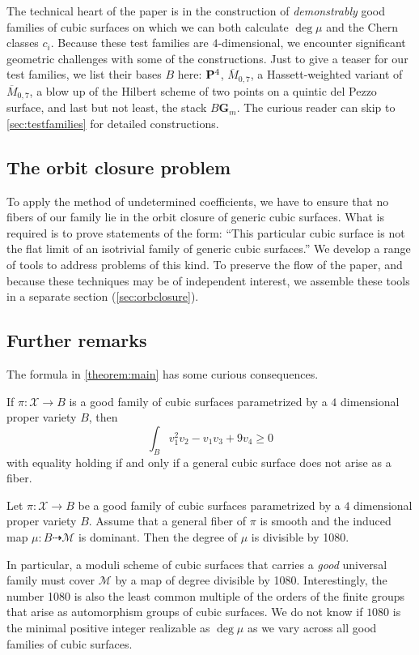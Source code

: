 \documentclass[12pt,reqno]{amsart}
\renewcommand{\to}{{\longrightarrow}}
\numberwithin{equation}{section}
\newcommand{\G}{\mathbf G}
\newcommand{\cX}{\mathcal{X}}
\begin{document}
The technical heart of the paper is in the construction of {\sl
  demonstrably} good families of cubic surfaces on which we can both
calculate $\deg \mu$ and the Chern classes $c_i$. Because these test
families are $4$-dimensional, we encounter significant geometric
challenges with some of the constructions.  Just to give a teaser for
our test families, we list their bases $B$ here: $\P^4$,
$\overline M_{0,7}$, a Hassett-weighted variant of
$\overline M_{0,7}$, a blow up of the Hilbert scheme of two points on
a quintic del Pezzo surface, and last but not least, the stack
$B\G_m$.  The curious reader can skip to \autoref{sec:testfamilies}
for detailed constructions.



\subsection{The orbit closure problem}
To apply the method of undetermined coefficients, we have to ensure
that no fibers of our family lie in the orbit closure of generic cubic
surfaces.  What is required is to prove statements of the form: ``This
particular cubic surface is not the flat limit of an isotrivial family
of generic cubic surfaces.''  We develop a range of tools to address
problems of this kind.  To preserve the flow of the paper, and because
these techniques may be of independent interest, we assemble these
tools in a separate section (\autoref{sec:orbclosure}).

\subsection{Further remarks}
The formula in \autoref{theorem:main} has some curious consequences.
\begin{corollary}
  \label{cor:ineq} If $\pi \colon \cX \to B$ is a good family of cubic
  surfaces parametrized by a $4$ dimensional proper variety $B$, then
  \[\int_{B} v_{1}^{2}v_{2} - v_{1}v_3 + 9v_{4} \geq 0\]
  with
  equality holding if and only if a general cubic surface does not
  arise as a fiber.
\end{corollary}

\begin{corollary}
  \label{cor:div} Let $\pi \colon \cX \to B$ be a good family of cubic
  surfaces parametrized by a $4$ dimensional proper variety $B$.
  Assume that a general fiber of $\pi$ is smooth and the induced map
  $\mu \colon B \dashrightarrow \mathcal M$ is dominant.  Then the
  degree of $\mu$ is divisible by 1080.
\end{corollary}
In particular, a moduli scheme of cubic surfaces that carries a {\sl
  good} universal family must cover $\mathcal M$ by a map of degree
divisible by 1080.  Interestingly, the number 1080 is also the least
common multiple of the orders of the finite groups that arise as
automorphism groups of cubic surfaces.  We do not know if $1080$ is
the minimal positive integer realizable as $\deg \mu$ as we vary
across all good families of cubic surfaces.
\end{document}
